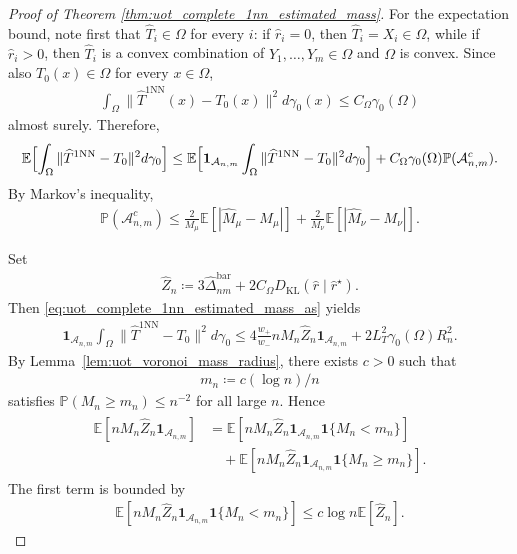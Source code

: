 \documentclass[10pt,a4paper]{amsart}
\newcommand{\Ep}{\mathbb{E}}
\newcommand{\KL}{\mathrm{KL}}
\renewcommand{\hat}{\widehat}
\begin{document}
\begin{proof}[Proof of Theorem \ref{thm:uot_complete_1nn_estimated_mass}]
For the expectation bound, note first that $\hat T_i\in\Omega$ for every $i$:
if $\hat r_i=0$, then $\hat T_i=X_i\in\Omega$, while if $\hat r_i>0$, then $\hat T_i$ is a convex combination of $Y_1,\dots,Y_m\in\Omega$ and $\Omega$ is convex.
Since also $T_0(x)\in\Omega$ for every $x\in\Omega$,
\begin{align}
    \int_\Omega \|\hat T^{\mathrm{1NN}}(x)-T_0(x)\|^2  d\gamma_0(x)
    \le
    C_\Omega \gamma_0(\Omega)
\end{align}
almost surely.
Therefore,
\begin{align}
\label{eq:uot_complete_1nn_estimated_mass_expect_split}
    \Ep\Bigl[
        \int_\Omega \|\hat T^{\mathrm{1NN}}-T_0\|^2  d\gamma_0
    \Bigr]
    \le
    \Ep\Bigl[
        \mathbf{1}_{\mathcal{A}_{n,m}}
        \int_\Omega \|\hat T^{\mathrm{1NN}}-T_0\|^2  d\gamma_0
    \Bigr]
    + C_\Omega \gamma_0(\Omega)\mathbb{P}(\mathcal{A}_{n,m}^c).
\end{align}
By Markov's inequality,
\begin{align}
\label{eq:uot_complete_1nn_estimated_mass_badmass_prob}
    \mathbb{P}(\mathcal{A}_{n,m}^c)
    \le
    \frac{2}{M_\mu}\Ep[|\hat M_\mu-M_\mu|]
    +
    \frac{2}{M_\nu}\Ep[|\hat M_\nu-M_\nu|].
\end{align}

Set
\begin{align}
    \hat Z_n
    \coloneqq
    3\hat\Delta_{nm}^{\mathrm{bar}}
    +2C_\Omega {D_\KL}(\hat r\mid \hat r^\star).
\end{align}
Then \eqref{eq:uot_complete_1nn_estimated_mass_as} yields
\begin{align}
\label{eq:uot_complete_1nn_estimated_mass_Z}
    \mathbf{1}_{\mathcal{A}_{n,m}}
    \int_\Omega \|\hat T^{\mathrm{1NN}}-T_0\|^2  d\gamma_0
    \le
    4\frac{w_+}{w_-}  nM_n \hat Z_n \mathbf{1}_{\mathcal{A}_{n,m}}
    + 2L_T^2\gamma_0(\Omega)R_n^2.
\end{align}
By Lemma~\ref{lem:uot_voronoi_mass_radius}, there exists $c>0$ such that
\begin{align}
    m_n \coloneqq c{(\log n)/n}
\end{align}
satisfies $\mathbb{P}(M_n\ge m_n)\le n^{-2}$ for all large $n$.
Hence
\begin{align}
\label{eq:uot_complete_1nn_estimated_mass_Mn_split}
\begin{aligned}
    \Ep[nM_n \hat Z_n \mathbf{1}_{\mathcal{A}_{n,m}}]
    &=
    \Ep[nM_n \hat Z_n \mathbf{1}_{\mathcal{A}_{n,m}}\mathbf{1}\{M_n<m_n\}] \\
    &\quad
    +
    \Ep[nM_n \hat Z_n \mathbf{1}_{\mathcal{A}_{n,m}}\mathbf{1}\{M_n\ge m_n\}].
\end{aligned}
\end{align}
The first term is bounded by
\begin{align}
\label{eq:uot_complete_1nn_estimated_mass_smallcells}
    \Ep[nM_n \hat Z_n \mathbf{1}_{\mathcal{A}_{n,m}}\mathbf{1}\{M_n<m_n\}]
    \le
    c\log n \Ep[\hat Z_n].
\end{align}


\end{proof}
\end{document}
